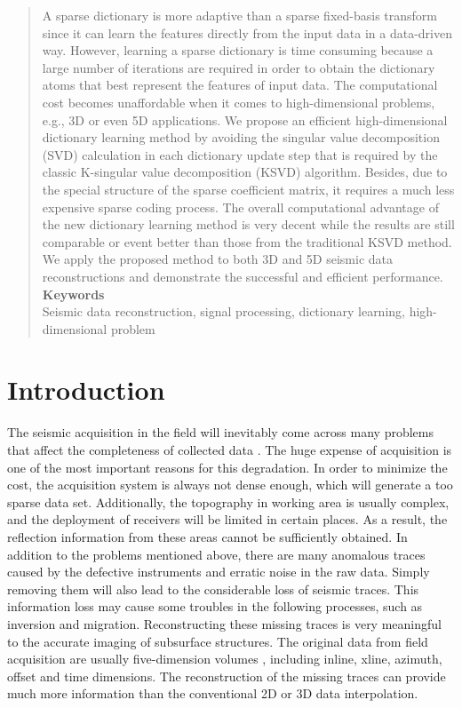 \begin{abstract}
A sparse dictionary is more adaptive than a sparse fixed-basis transform since it can learn the features directly from the input data in a data-driven way.  However, learning a sparse dictionary is time consuming because a large number of iterations are required in order to obtain the dictionary atoms that best represent the features of input data. The computational cost becomes unaffordable when it comes to high-dimensional problems, e.g., 3D or even 5D applications. We propose an efficient high-dimensional dictionary learning method by avoiding the singular value decomposition (SVD) calculation in each dictionary update step that is required by the classic K-singular value decomposition (KSVD) algorithm. Besides, due to the special structure of the sparse coefficient matrix, it requires a much less expensive sparse coding process. The overall computational advantage of the new dictionary learning method is very decent while the results are still comparable or event better than those from the traditional KSVD method. We apply the proposed method to both 3D and 5D seismic data reconstructions and demonstrate the successful and efficient performance.\\
\textbf{Keywords}\\
Seismic data reconstruction, signal processing, dictionary learning, high-dimensional problem
\end{abstract}


\section{Introduction}
The seismic acquisition in the field will inevitably come across many problems that affect the completeness of collected data \cite{Chao2018Adap}. The huge expense of acquisition is one of the most important reasons for this degradation. In order to minimize the cost, the acquisition system is always not dense enough, which will generate a too sparse data set. Additionally, the topography in working area is usually complex, and the deployment of receivers will be limited in certain places. As a result, the reflection information from these areas cannot be sufficiently obtained. In addition to the problems mentioned above, there are many anomalous traces caused by the defective instruments and erratic noise in the raw data. Simply removing them will also lead to the considerable loss of seismic traces. This information loss may cause some troubles in the following processes, such as inversion and migration. Reconstructing these missing traces is very meaningful to the accurate imaging of subsurface structures. The original data from field acquisition are usually five-dimension volumes \cite{yangkang2016irr5d,jianjun2017five}, including inline, xline, azimuth, offset and time dimensions. The reconstruction of the missing traces can provide much more information than the conventional 2D or 3D data interpolation. 

